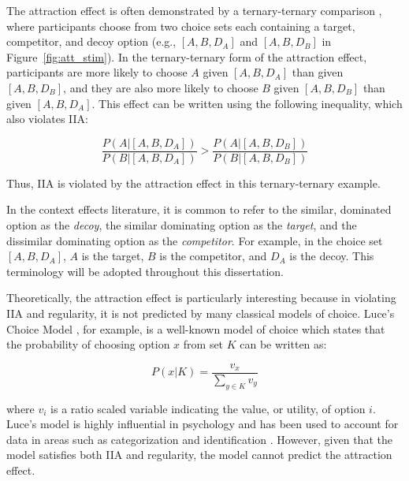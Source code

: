 The attraction effect is often demonstrated by a ternary-ternary comparison \parencite{trueblood2013not}, where participants choose from two choice sets each containing a target, competitor, and decoy option (e.g., $[A,B,D_{A}]$ and  $[A,B,D_{B}]$ in Figure~\ref{fig:att_stim}). In the ternary-ternary form of the attraction effect, participants are more likely to choose $A$ given $[A,B,D_{A}]$ than given $[A,B,D_{B}]$, and they are also more likely to choose $B$ given $[A,B,D_{B}]$ than given $[A,B,D_{A}]$. This effect can be written using the following inequality, which also violates IIA:

\begin{equation}
  \frac{P(A|[A,B,D_{A}])}{P(B|[A,B,D_{A}])}>\frac{P(A|[A,B,D_{B}])}{P(B|[A,B,D_{B}])}
  \label{eqn:iia_att2}
\end{equation}

Thus, IIA is violated by the attraction effect in this ternary-ternary example.

In the context effects literature, it is common to refer to the similar, dominated option as the \textit{decoy}, the similar dominating option as the \textit{target}, and the dissimilar dominating option as the \textit{competitor}. For example, in the choice set $[A,B,D_{A}]$, $A$ is the target, $B$ is the competitor, and $D_{A}$ is the decoy. This terminology will be adopted throughout this dissertation.

Theoretically, the attraction effect is particularly interesting because in violating IIA and regularity, it is not predicted by many classical models of choice. Luce's Choice Model \parencite{luce1959individual}, for example, is a well-known model of choice which states that the probability of choosing option $x$ from set $K$ can be written as:

\begin{equation}
    P(x|K) = \frac{v_{x}}{\sum_{y \in K} v_{y}}
\end{equation}

where $v_{i}$ is a ratio scaled variable indicating the value, or utility, of option $i$. Luce's model is highly influential in psychology and has been used to account for data in areas such as categorization \parencite{nosofskyAttentionSimilarityIdentificationCategorization1986} and identification \parencite{townsend1971theoretical}. However, given that the model satisfies both IIA and regularity, the model cannot predict the attraction effect. 

